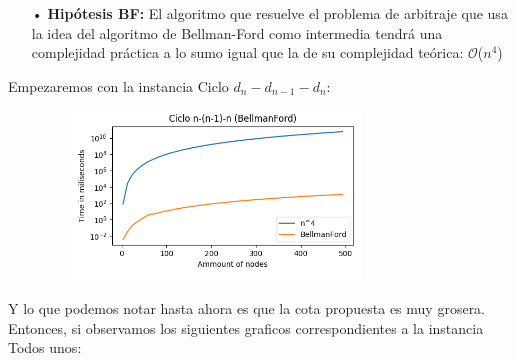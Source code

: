 \documentclass[11pt,a4paper]{article}
\begin{document}
\begin{itemize}
    \item[•] \textbf{Hip\'otesis BF:} El algoritmo que resuelve el problema de arbitraje que usa la idea del algoritmo de Bellman-Ford como intermedia tendr\'a una complejidad pr\'actica a lo sumo igual que la de su complejidad te\'orica: $\mathcal{O}$($n^{4}$)
\end{itemize}
Empezaremos con la instancia Ciclo $d_{n}-d_{n-1}-d_{n}$:
\begin{figure}[h]
    \centering
    \includegraphics[height = 4.5cm,width = 9cm]{BFlog-nnl1n.png}
\end{figure}
\pagebreak

Y lo que podemos notar hasta ahora es que la cota propuesta es muy grosera. Entonces, si observamos los siguientes graficos correspondientes a la instancia Todos unos:
\end{document}
